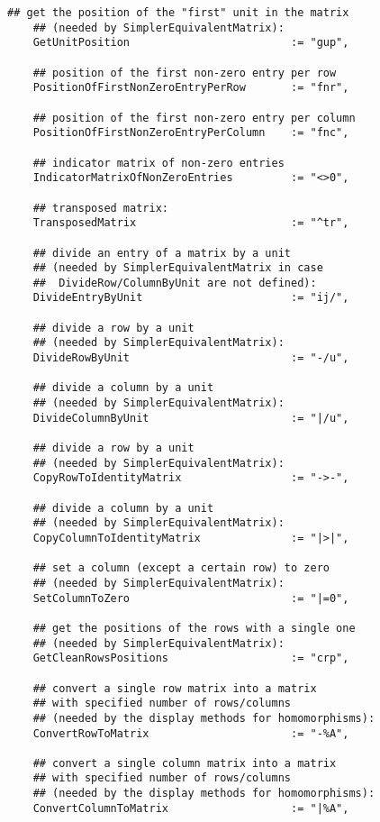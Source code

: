 \documentclass[a4paper,11pt]{report}
\begin{document}
{{{\begin{Verbatim}[fontsize=\small,frame=single,label=Code]
    ## get the position of the "first" unit in the matrix
    ## (needed by SimplerEquivalentMatrix):
    GetUnitPosition                         := "gup",
    
    ## position of the first non-zero entry per row
    PositionOfFirstNonZeroEntryPerRow       := "fnr",
    
    ## position of the first non-zero entry per column
    PositionOfFirstNonZeroEntryPerColumn    := "fnc",
    
    ## indicator matrix of non-zero entries
    IndicatorMatrixOfNonZeroEntries         := "<>0",
    
    ## transposed matrix:
    TransposedMatrix                        := "^tr",
    
    ## divide an entry of a matrix by a unit
    ## (needed by SimplerEquivalentMatrix in case
    ##  DivideRow/ColumnByUnit are not defined):
    DivideEntryByUnit                       := "ij/",
    
    ## divide a row by a unit
    ## (needed by SimplerEquivalentMatrix):
    DivideRowByUnit                         := "-/u",
    
    ## divide a column by a unit
    ## (needed by SimplerEquivalentMatrix):
    DivideColumnByUnit                      := "|/u",
    
    ## divide a row by a unit
    ## (needed by SimplerEquivalentMatrix):
    CopyRowToIdentityMatrix                 := "->-",
    
    ## divide a column by a unit
    ## (needed by SimplerEquivalentMatrix):
    CopyColumnToIdentityMatrix              := "|>|",
    
    ## set a column (except a certain row) to zero
    ## (needed by SimplerEquivalentMatrix):
    SetColumnToZero                         := "|=0",
    
    ## get the positions of the rows with a single one
    ## (needed by SimplerEquivalentMatrix):
    GetCleanRowsPositions                   := "crp",
    
    ## convert a single row matrix into a matrix
    ## with specified number of rows/columns
    ## (needed by the display methods for homomorphisms):
    ConvertRowToMatrix                      := "-%A",
    
    ## convert a single column matrix into a matrix
    ## with specified number of rows/columns
    ## (needed by the display methods for homomorphisms):
    ConvertColumnToMatrix                   := "|%A",
    

\end{Verbatim}}}}
\end{document}

